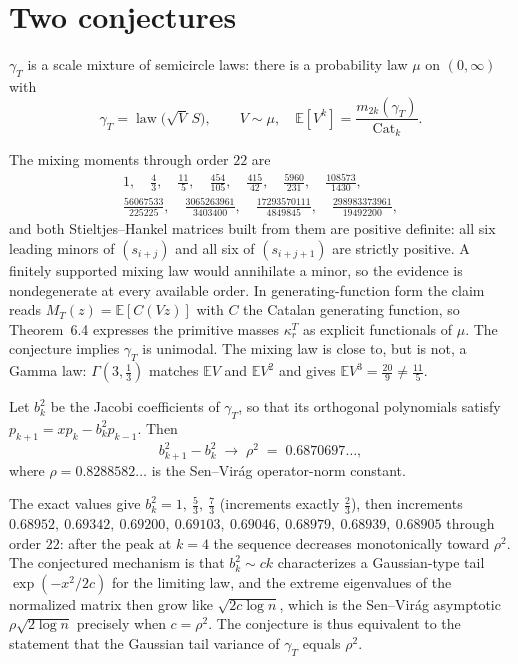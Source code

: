 \section{Two conjectures}

\begin{conjecture}\label{conj:mix}
$\gamma_T$ is a scale mixture of semicircle laws: there is a probability
law $\mu$ on $(0,\infty)$ with
\[
\gamma_T=\operatorname{law}\bigl(\sqrt V\,S\bigr),\qquad V\sim\mu,\quad
\mathbb E[V^k]=\frac{m_{2k}(\gamma_T)}{\mathrm{Cat}_k}.
\]
\end{conjecture}

The mixing moments through order $22$ are
\begin{gather*}
1,\quad \frac43,\quad \frac{11}5,\quad \frac{454}{105},\quad
\frac{415}{42},\quad \frac{5960}{231},\quad \frac{108573}{1430},\\[2pt]
\frac{56067533}{225225},\quad \frac{3065263961}{3403400},\quad
\frac{17293570111}{4849845},\quad \frac{298983373961}{19492200},
\end{gather*}
and both Stieltjes--Hankel matrices built from them are positive definite:
all six leading minors of $(s_{i+j})$ and all six of $(s_{i+j+1})$ are
strictly positive.  A finitely supported mixing law would annihilate a
minor, so the evidence is nondegenerate at every available order.  In
generating-function form the claim reads $M_T(z)=\mathbb E[C(Vz)]$ with
$C$ the Catalan generating function, so Theorem~6.4 expresses the
primitive masses $\kappa_r^T$ as explicit functionals of $\mu$.  The
conjecture implies $\gamma_T$ is unimodal.  The mixing law is close to,
but is not, a Gamma law: $\Gamma(3,\tfrac13)$ matches $\mathbb E V$ and
$\mathbb E V^2$ and gives $\mathbb E V^3=\tfrac{20}9\ne\tfrac{11}5$.

\begin{conjecture}\label{conj:slope}
Let $b_k^2$ be the Jacobi coefficients of $\gamma_T$, so that its
orthogonal polynomials satisfy $p_{k+1}=xp_k-b_k^2p_{k-1}$.  Then
\[
b_{k+1}^2-b_k^2\;\longrightarrow\;\rho^2\;=\;0.6870697\ldots,
\]
where $\rho=0.8288582\ldots$ is the Sen--Vir\'ag operator-norm constant.
\end{conjecture}

The exact values give $b_k^2=1,\ \tfrac53,\ \tfrac73$ (increments exactly
$\tfrac23$), then increments
$0.68952,\ 0.69342,\ 0.69200,\ 0.69103,\ 0.69046,\ 0.68979,\ 0.68939,\
0.68905$ through order $22$: after the peak at $k=4$ the sequence
decreases monotonically toward $\rho^2$.  The conjectured mechanism is
that $b_k^2\sim ck$ characterizes a Gaussian-type tail
$\exp(-x^2/2c)$ for the limiting law, and the extreme eigenvalues of the
normalized matrix then grow like $\sqrt{2c\log n}$, which is the
Sen--Vir\'ag asymptotic $\rho\sqrt{2\log n}$ precisely when $c=\rho^2$.
The conjecture is thus equivalent to the statement that the Gaussian tail
variance of $\gamma_T$ equals $\rho^2$.

